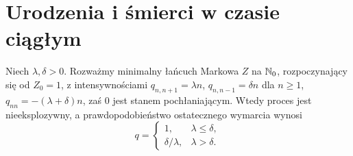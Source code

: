 \section{Urodzenia i śmierci w czasie ciągłym}
\begin{twierdzenie}
Niech $\lambda,\delta>0$. Rozważmy minimalny łańcuch Markowa
$Z$ na $\mathbb{N}_0$, rozpoczynający się od $Z_0=1$, z intensywnościami
$q_{n,n+1}=\lambda n$, $q_{n,n-1}=\delta n$ dla $n\ge1$,
$q_{nn}=-(\lambda+\delta)n$, zaś $0$ jest stanem pochłaniającym.
Wtedy proces jest nieeksplozywny, a prawdopodobieństwo
ostatecznego wymarcia wynosi
\[
q=\begin{cases}1,&\lambda\le\delta,\\
\delta/\lambda,&\lambda>\delta.
\end{cases}
\]
\end{twierdzenie}
